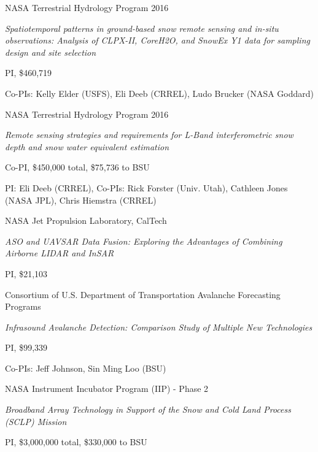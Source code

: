\documentclass[11pt]{article}
\renewenvironment{itemize}{
  \begin{list}{}{
    \setlength{\leftmargin}{1.5em}
    \setlength{\itemsep}{0pt}
    \setlength{\parskip}{0pt}
  }
}{
  \end{list}
}
\begin{document}
\begin{itemize}
\item [6/2017-6/2022] NASA Terrestrial Hydrology Program 2016
\begin{itemize}
\item \textit{Spatiotemporal patterns in ground-based snow remote sensing and in-situ observations: Analysis of CLPX-II, CoreH2O, and SnowEx Y1 data for sampling design and site selection}
\item PI, \$460,719
\item Co-PIs: Kelly Elder (USFS), Eli Deeb (CRREL), Ludo Brucker (NASA Goddard)
\end{itemize}

\item [6/2017-6/2022] NASA Terrestrial Hydrology Program 2016
\begin{itemize}
\item \textit{Remote sensing strategies and requirements for L-Band interferometric snow depth and snow water equivalent estimation}
\item Co-PI, \$450,000 total, \$75,736 to BSU
\item PI: Eli Deeb (CRREL), Co-PIs: Rick Forster (Univ. Utah), Cathleen Jones (NASA JPL), Chris Hiemstra (CRREL)
\end{itemize}

\item [6/2017-8/2018] NASA Jet Propulsion Laboratory, CalTech
\begin{itemize}
\item \textit{ASO and UAVSAR Data Fusion: Exploring the Advantages of Combining Airborne LIDAR and InSAR}
\item PI, \$21,103
\end{itemize}

\item [6/2017-8/2018] Consortium of U.S. Department of Transportation Avalanche Forecasting Programs
\begin{itemize}
\item \textit{Infrasound Avalanche Detection: Comparison Study of Multiple New Technologies}
\item PI, \$99,339
\item Co-PIs: Jeff Johnson, Sin Ming Loo (BSU)
\end{itemize}

\item [2/2015-5/2017] NASA Instrument Incubator Program (IIP) - Phase 2
\begin{itemize}
\item \textit{Broadband Array Technology in Support of the Snow and Cold Land Process (SCLP) Mission}
\item PI, \$3,000,000 total, \$330,000 to BSU
\end{itemize}


\end{itemize}
\end{document}
